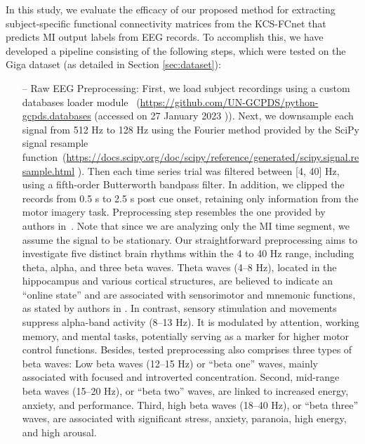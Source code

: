 In this study, we evaluate the efficacy of our proposed method for extracting subject-specific functional connectivity matrices from the KCS-FCnet that predicts MI output labels from EEG records. To accomplish this, we have developed a pipeline consisting of the following steps, which were tested on the Giga dataset (as detailed in Section \ref{sec:dataset}): 

\begin{itemize}
    \item[--] {{Raw EEG Preprocessing:} 
    } First, we load subject recordings using a custom databases loader {module} 
    ~(\url{https://github.com/UN-GCPDS/python-gcpds.databases} ({accessed on 27 January 2023}
    )). Next, we downsample each signal from 512 Hz to 128 Hz using the Fourier method provided by the SciPy signal resample function~(\url{https://docs.scipy.org/doc/scipy/reference/generated/scipy.signal.resample.html} ). Then each time series trial was filtered between [4, 40] Hz, using a fifth-order Butterworth bandpass filter. In addition, we clipped the records from 0.5 s to 2.5 s post cue onset, retaining only information from the motor imagery task. Preprocessing step resembles the one provided by authors in~\cite{lawhern2018eegnet}. Note that since we are analyzing only the MI time segment, we assume the signal to be stationary. Our straightforward preprocessing aims to investigate five distinct brain rhythms within the 4 to 40 Hz range, including theta, alpha, and three beta waves. Theta waves (4--8 Hz), located in the hippocampus and various cortical structures, are believed to indicate an ``online state'' and are associated with sensorimotor and mnemonic functions, as stated by authors in \cite{ABHANG201651}. In contrast, sensory stimulation and movements suppress alpha-band activity (8--13 Hz). It is modulated by attention, working memory, and mental tasks, potentially serving as a marker for higher motor control functions. Besides, tested preprocessing also comprises three types of beta waves: Low beta waves (12--15 Hz) or ``beta one'' waves, mainly associated with focused and introverted concentration. Second, mid-range beta waves (15--20 Hz), or ``beta two'' waves, are linked to increased energy, anxiety, and performance. Third, high beta waves (18--40 Hz), or ``beta three'' waves, are associated with significant stress, anxiety, paranoia, high energy, and high arousal.
    

\end{itemize}
